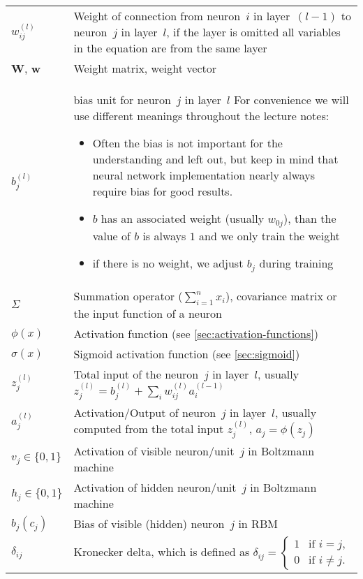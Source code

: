 \begin{tabularx}{\textwidth}{ l X }
\midrule %
$w_{ij}^{(l)}$	& Weight of connection from neuron~$i$ in layer~$(l-1)$ to neuron~$j$ in layer~$l$, if the layer is omitted all variables in the equation are from the same layer \\
$\mathbf{W}$, $\mathbf{w}$ & Weight matrix, weight vector \\
$b_j^{(l)}$	& bias unit for neuron~$j$ in layer~$l$ \newline For convenience we will use different meanings throughout the lecture notes:
				\begin{itemize}
				\item Often the bias is not important for the understanding and left out, but keep in mind that neural network implementation nearly always require bias for good results.
				\item $b$ has an associated weight (usually $w_{0j}$), than the value of $b$ is always $1$ and we only train the weight
				\item if there is no weight, we adjust $b_j$ during training
				\end{itemize} \\
$\Sigma$		& Summation operator (\eg $\sum_{i=1}^n x_i$), covariance matrix or the input function of a neuron \\
$\phi(x)$		& Activation function (see \ref{sec:activation-functions}) \\
$\sigma(x)$		& Sigmoid activation function (see \ref{sec:sigmoid}) \\
$z_j^{(l)}$		& Total input of the neuron~$j$ in layer~$l$, usually $z_j^{(l)} = b_j^{(l)} + \sum_i w_{ij}^{(l)} a_i^{(l-1)}$ \\
$a_j^{(l)}$		& Activation/Output of neuron~$j$ in layer~$l$, usually computed from the total input $z_j^{(l)}$, $a_j=\phi(z_j)$ \\

\midrule %
$v_j \in \{0,1\}$ & Activation of visible neuron/unit~$j$ in Boltzmann machine \\
$h_j \in \{0,1\}$ & Activation of hidden neuron/unit~$j$ in Boltzmann machine \\
$b_j (c_j)$		& Bias of visible (hidden) neuron~$j$ in \gls{RBM} \\

\midrule %
$\delta_{ij}$	&  Kronecker delta, which is defined as $\delta_{ij}=\begin{cases}1 &\text{if } i = j,\\0 &\text{if } i \neq j.\end{cases}$
\end{tabularx}